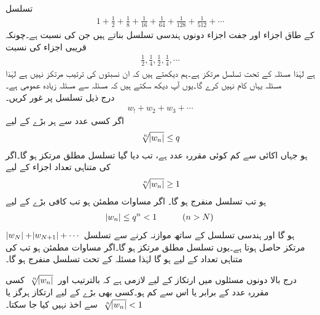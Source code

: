 \quad {}\\
تسلسل
\begin{align*}
1+\frac{1}{2}+\frac{1}{8}+\frac{1}{16}+\frac{1}{64}+\frac{1}{128}+\frac{1}{512}+\cdots
\end{align*}
کے طاق اجزاء اور جفت اجزاء دونوں ہندسی تسلسل بناتے ہیں جن کی  نسبت   ہے۔چونکہ قریبی اجزاء کی نسبت 
\begin{align*}
\frac{1}{2},\frac{1}{4},\frac{1}{2},\frac{1}{4},\cdots
\end{align*}
ہے لہٰذا مسئلہ  کے تحت تسلسل مرتکز ہے۔ہم دیکھتے ہیں کہ ان نسبتوں  کی ترتیب مرتکز نہیں ہے لہٰذا  مسئلہ  یہاں کام نہیں کرے گا۔یوں آپ دیکھ سکتے ہیں کہ مسئلہ  سے مسئلہ  زیادہ عمومی ہے۔
\quad {}\\
درج ذیل تسلسل پر غور کریں۔
\begin{align*}
w_!+w_2+w_3+\cdots
\end{align*}
اگر کسی عدد  سے ہر بڑے   کے لیے
\begin{align}\label{مساوات_ترتیب_جذری_الف}
\sqrt[\leftroot{-2}n]{\abs{w_n}}\le q
\end{align}
ہو جہاں  اکائی سے کم کوئی مقررہ عدد ہے، تب دیا گیا تسلسل مطلق مرتکز ہو گا۔اگر  کی متناہی تعداد اجزاء  کے لیے 
\begin{align}\label{مساوات_ترتیب_جذری_ب}
\sqrt[\leftroot{-2}n]{\abs{w_n}}\ge 1
\end{align}
ہو تب تسلسل منفرج ہو گا۔
\quad
اگر مساوات  مطمئن ہو تب کافی بڑے  کے لیے
\begin{align*}
\abs{w_n}\le q^n<1 \quad \quad \quad (n>N)
\end{align*}
ہو گا اور ہندسی تسلسل کے ساتھ موازنہ کرنے سے تسلسل
$\,\abs{w_N}+\abs{w_{N+1}}+\cdots\,$
مرتکز حاصل ہوتا ہے۔یوں تسلسل  مطلق مرتکز ہو گا۔اگر مساوات  مطمئن ہو تب  کی متناہی تعداد کے لیے   ہو گا  لہٰذا مسئلہ  کے تحت تسلسل منفرج ہو گا۔


درج بالا دونوں مسئلوں میں ارتکاز کے لیے لازمی ہے کہ بالترتیب  اور 
$\,\sqrt[\leftroot{-2}n]{\abs{w_n}}\,$
 کسی مقررہ عدد  کے برابر یا اس سے کم ہو۔کسی بھی بڑے  کے لیے ارتکاز ہرگز    یا 
$\,\sqrt[\leftroot{-2}n]{\abs{w_n}}<1\,$
سے اخذ نہیں کیا جا سکتا۔

